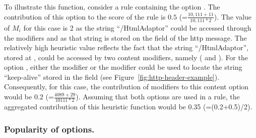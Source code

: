 \documentclass[sigconf,review, anonymous]{acmart}
\begin{document}
    
To illustrate this function, consider a rule containing the option
. The contribution of this option to
the score of the rule is $0.5$ (=$\frac{10,111+11}{10,111*2}$). The
value of $M_i$ for this case is 2 as the string ``/HtmlAdaptor'' could
be accessed through the modifiers  and
 as that string is stored on the
 field of the http message. The relatively high heuristic value reflects the fact that
the string ``/HtmlAdaptor'', stored at , could be
accessed by two content modifiers, namely ( and
).  For the option , either the modifier  or the
modifier  could be used to locate the string
``keep-alive'' stored in the field  (see
Figure~\ref{fig:http-header-example}). Consequently, for this case,
the contribution of modifiers to this content option would be $0.2$
(=$\frac{4089+29}{10111*2}$). Assuming that both options are used in a
rule, the aggregated contribution of this heuristic function would be
0.35 (=(0.2+0.5)/2).


\subsubsection{Popularity of options.}



\end{document}
